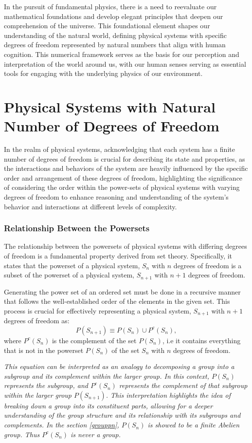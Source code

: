 \documentclass{article}
\begin{document}
In the pursuit of fundamental physics, there is a need to reevaluate our mathematical foundations and develop elegant principles that deepen our comprehension of the universe. This foundational element shapes our understanding of the natural world, defining physical systems with specific degrees of freedom represented by natural numbers that align with human cognition. This numerical framework serves as the basis for our perception and interpretation of the world around us, with our human senses serving as essential tools for engaging with the underlying physics of our environment.


\section{ Physical Systems with Natural Number of  Degrees of Freedom}
In the realm of physical systems, acknowledging that each system has a finite number of degrees of freedom is crucial for describing its state and properties, as the interactions and behaviors of the system are heavily influenced by the specific order and arrangement of these degrees of freedom, highlighting the significance of considering the order within the power-sets of physical systems with varying degrees of freedom to enhance reasoning and understanding of the system's behavior and interactions at different levels of complexity.
\subsubsection{Relationship Between the Powersets}
The relationship between the powersets of physical systems with differing degrees of freedom is a fundamental property derived from set theory. 
Specifically, it states that the powerset of a physical system, $S_{n}$ with $n$ degrees of freedom is a subset of the powerset of a physical system, $S_{n+1}$  with $n+1$ degrees of freedom.
 
Generating the power set of an ordered set must be done in a recursive manner that follows the well-established order of the elements in the given set. 
This process is crucial for effectively representing a physical system, $S_{n+1}$ with $n+1$ degrees of freedom as:
$$
P(S_{n+1}) \equiv  P(S_{n}) \cup P^{c}(S_{n}),
$$
where $P^{c}(S_{n})$ is the complement of the set $P(S_{n})$, i.e it contains everything that is not in the powerset $P(S_{n})$ of the set $S_{n}$ with $n$ degrees of freedom. 

{\it 
This equation can be interpreted as an analogy to decomposing a group into a subgroup and its complement within the larger group. In this context, $P(S_{n})$ represents the subgroup, and $P^{c}(S_{n})$ represents the complement of that subgroup within the larger group $P(S_{n+1})$.
This interpretation highlights the idea of breaking down a group into its constituent parts, allowing for a deeper understanding of the group structure and its relationship with its subgroups and complements. In the section \ref{grouppn}, $P(S_{n})$ is showed to be a finite Abelien group. Thus $P^{c}(S_{n})$ is never a group. 
}
\end{document}
